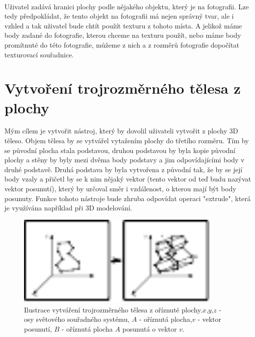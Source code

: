 \documentclass[11pt,twoside,a4paper]{book}
\begin{document}
\paragraph{}
Uživatel zadává hranici plochy podle nějakého objektu, který je na fotografii. Lze tedy předpokládat, že tento objekt na fotografii má nejen správný tvar, ale i vzhled a tak uživatel bude chtít použít texturu z tohoto místa. A jelikož máme body zadané do fotografie, kterou chceme na texturu použít, nebo máme body promítnuté do této fotografie, můžeme z nich a z rozměrů fotografie dopočítat texturovací souřadnice.

\section{Vytvoření trojrozměrného tělesa z plochy}
\label{analyzaEnd}

\label{extrude}
Mým cílem je vytvořit nástroj, který by dovolil uživateli vytvořit z plochy 3D těleso. Objem tělesa by se vytvářel vytažením plochy do třetího rozměru. Tím by se původní plocha stala podstavou, druhou podstavou by byla kopie původní plochy a stěny by byly mezi dvěma body podstavy a jim odpovídajícími body v druhé podstavě. Druhá podstava by byla vytvořena z původní tak, že by se její body vzaly a přičetl by se k nim nějaký vektor (tento vektor od teď budu nazývat vektor posunutí), který by určoval směr i vzdálenost, o kterou mají být body posunuty.  Funkce tohoto nástroje bude zhruba odpovídat operaci "extrude", která je využívána například při 3D modelování. \cite{Extrude}

\begin{figure}[h]
	\begin{center}
		\includegraphics[width=10cm]{ilustrace/Il-2-3}
		\caption{Ilustrace vytváření trojrozměrného tělesa z oříznuté plochy.$x$,$y$,$z$ - osy světového souřadného systému, $A$ - oříznutá plocha,$v$ - vektor posunutí, $B$ - oříznutá plocha $A$ posunutá o vektor $v$.}
		\label{fig:10-1}
	\end{center}
\end{figure}
\end{document}
